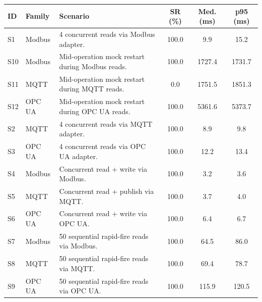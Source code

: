     \begin{tabularx}{\columnwidth}{@{}llYccc@{}}
        \toprule
        ID & Family & Scenario & SR (\%) & Med. (ms) & p95 (ms) \\
        \midrule
        S1 & Modbus & 4 concurrent reads via Modbus adapter. & 100.0 & 9.9 & 15.2 \\
        S10 & Modbus & Mid-operation mock restart during Modbus reads. & 100.0 & 1727.4 & 1731.7 \\
        S11 & MQTT & Mid-operation mock restart during MQTT reads. & 0.0 & 1751.5 & 1851.3 \\
        S12 & OPC UA & Mid-operation mock restart during OPC UA reads. & 100.0 & 5361.6 & 5373.7 \\
        S2 & MQTT & 4 concurrent reads via MQTT adapter. & 100.0 & 8.9 & 9.8 \\
        S3 & OPC UA & 4 concurrent reads via OPC UA adapter. & 100.0 & 12.2 & 13.4 \\
        S4 & Modbus & Concurrent read + write via Modbus. & 100.0 & 3.2 & 3.6 \\
        S5 & MQTT & Concurrent read + publish via MQTT. & 100.0 & 3.7 & 4.0 \\
        S6 & OPC UA & Concurrent read + write via OPC UA. & 100.0 & 6.4 & 6.7 \\
        S7 & Modbus & 50 sequential rapid-fire reads via Modbus. & 100.0 & 64.5 & 86.0 \\
        S8 & MQTT & 50 sequential rapid-fire reads via MQTT. & 100.0 & 69.4 & 78.7 \\
        S9 & OPC UA & 50 sequential rapid-fire reads via OPC UA. & 100.0 & 115.9 & 120.5 \\
        \bottomrule
    \end{tabularx}
